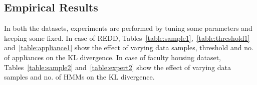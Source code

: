 \documentclass[conference]{IEEEtran}
\begin{document}


\subsection{Empirical Results}
In both the datasets, experiments are performed by tuning some parameters and keeping some fixed. In case of REDD, Tables~\ref{table:sample1},~\ref{table:threshold1} and~\ref{table:appliance1} show the effect of varying data samples, threshold and no. of appliances on the KL divergence.
In case of faculty housing dataset, Tables~\ref{table:sample2} and~\ref{table:expert2} show the effect of varying data samples and no. of HMMs on the KL divergence.


\end{document}
